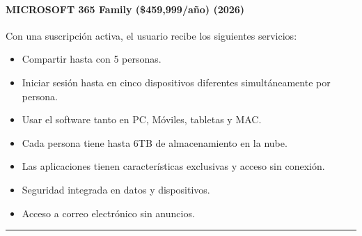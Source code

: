 \documentclass[letterpaper,10pt,spanish]{sphinxmanual}
\begin{document}
\paragraph{MICROSOFT 365 Family (\$459,999/año) (2026)}
\label{\detokenize{1_guias/10ofimatica/G1011:microsoft-365-family-459-999-ano-2026}}
\sphinxAtStartPar
\sphinxfootnotemark[3] Con una suscripción activa, el usuario recibe los siguientes servicios:
\begin{itemize}
\item {} 
\sphinxAtStartPar
Compartir hasta con 5 personas.

\item {} 
\sphinxAtStartPar
Iniciar sesión hasta en cinco dispositivos diferentes simultáneamente por persona.

\item {} 
\sphinxAtStartPar
Usar el software tanto en PC, Móviles, tabletas y MAC.

\item {} 
\sphinxAtStartPar
Cada persona tiene hasta 6TB de almacenamiento en la nube.

\item {} 
\sphinxAtStartPar
Las aplicaciones tienen características exclusivas y acceso sin conexión.

\item {} 
\sphinxAtStartPar
Seguridad integrada en datos y dispositivos.

\item {} 
\sphinxAtStartPar
Acceso a correo electrónico sin anuncios.

\end{itemize}


\bigskip\hrule\bigskip
\end{document}

